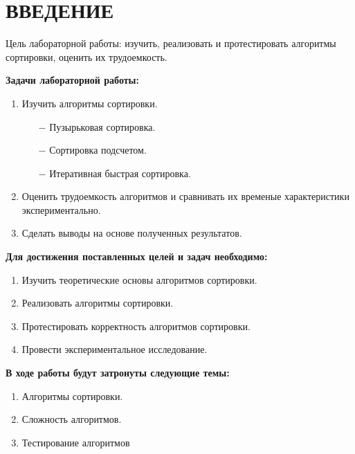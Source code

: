 \chapter{ВВЕДЕНИЕ}

Цель лабораторной работы: изучить, реализовать и протестировать алгоритмы сортировки,
оценить их трудоемкость.\newline


\textbf{Задачи лабораторной работы:}
\begin{enumerate}
\item Изучить алгоритмы сортировки.
\begin{enumerate}
    \item[$-$] Пузырьковая сортировка.
    \item[$-$] Сортировка подсчетом.
    \item[$-$] Итеративная быстрая сортировка.
\end{enumerate}
\item Оценить трудоемкость алгоритмов и сравнивать их временые характеристики экспериментально.
\item Сделать выводы на основе полученных результатов.
\end{enumerate}

\textbf{Для достижения поставленных целей и задач необходимо:}
\begin{enumerate}
    \item Изучить теоретические основы алгоритмов сортировки.
    \item Реализовать алгоритмы сортировки.
    \item Протестировать корректность алгоритмов сортировки.
    \item Провести экспериментальное исследование.
\end{enumerate}

\textbf{В ходе работы будут затронуты следующие темы:}
\begin{enumerate}
\item Алгоритмы сортировки.
\item Сложность алгоритмов.
\item Тестирование алгоритмов
\end{enumerate}
